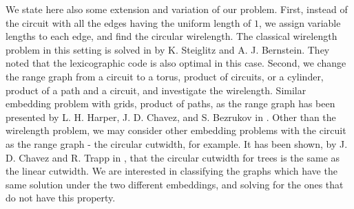\documentclass[12pt]{ucthesis}
\theoremstyle{plain}
\theoremstyle{definition}
\begin{document}
We state here also some extension and variation of our problem.
First, instead of the circuit with all the edges having the uniform length of $1$,
we assign variable lengths to each edge, and find the circular wirelength.
The classical wirelength problem in this setting is solved in \cite{Steiglitz.1965}
by K. Steiglitz and A. J. Bernstein.
They noted that the lexicographic code is also optimal in this case.
Second, we change the range graph from a circuit to a torus, product of circuits,
or a cylinder, product of a path and a circuit, and investigate the wirelength.
Similar embedding problem with grids, product of paths, as the range graph
has been presented by L. H. Harper, J. D. Chavez, and S. Bezrukov in \cite{Bezrukov.2000}.
Other than the wirelength problem, we may consider other embedding problems
with the circuit as the range graph - the circular cutwidth, for example.
It has been shown, by J. D. Chavez and R. Trapp in \cite{Chavez.1998},
that the circular cutwidth for trees is the same as the linear cutwidth.
We are interested in classifying the graphs which have the same solution
under the two different embeddings, and solving for the ones that do not have this property.
\end{document}
